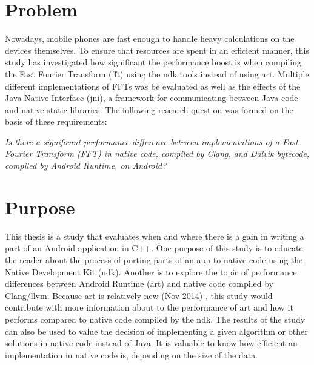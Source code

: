 \section{Problem}
Nowadays, mobile phones are fast enough to handle heavy calculations on the devices themselves. To ensure that resources are spent in an efficient manner, this study has investigated how significant the performance boost is when compiling the Fast Fourier Transform (\gls{fft}) using the \gls{ndk} tools instead of using \gls{art}. Multiple different implementations of FFTs was be evaluated as well as the effects of the Java Native Interface (\gls{jni}), a framework for communicating between Java code and native static libraries. The following research question was formed on the basis of these requirements:


\begin{center}
    \textit{Is there a significant performance difference between implementations of a Fast Fourier Transform (FFT) in native code, compiled by Clang, and Dalvik bytecode, compiled by Android Runtime, on Android?}
\end{center}

\section{Purpose}
This thesis is a study that evaluates when and where there is a gain in writing a part of an Android application in C++. One purpose of this study is to educate the reader about the process of porting parts of an app to native code using the Native Development Kit (\gls{ndk}). Another is to explore the topic of performance differences between Android Runtime (\gls{art}) and native code compiled by Clang/\gls{llvm}. Because \gls{art} is relatively new (Nov 2014) \cite{android:dalvik:release}, this study would contribute with more information about to the performance of \gls{art} and how it performs compared to native code compiled by the \gls{ndk}. The results of the study can also be used to value the decision of implementing a given algorithm or other solutions in native code instead of Java. It is valuable to know how efficient an implementation in native code is, depending on the size of the data.

